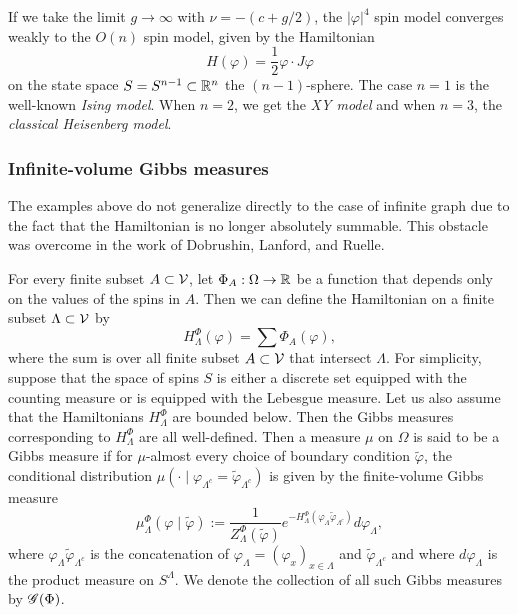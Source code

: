 If we take the limit $g\to\infty$ with $\nu = -(c + g / 2)$, the
$|\varphi|^4$ spin model converges
weakly to the $O(n)$ spin model, given by the Hamiltonian
\begin{equation}
H(\varphi) = \frac{1}{2} \varphi \cdot J \varphi
\end{equation}
on the state space $S = S^{n-1} \subset {\mathbb R}^n$ the $(n-1)$-sphere.
The case $n = 1$ is the well-known \emph{Ising model}. When $n = 2$, we get the \emph{XY model}
and when $n = 3$, the \emph{classical Heisenberg model}.


\subsubsection{Infinite-volume Gibbs measures}


The examples above do not generalize directly to the case of infinite graph due to the fact
that the Hamiltonian is no longer absolutely summable. This obstacle was overcome in the work
of Dobrushin, Lanford, and Ruelle.

For every finite subset $A \subset \mathcal{V}$, let $\Phi_A : \Omega \rightarrow {\mathbb R}$ be a function that
depends only on the values of the spins in $A$. Then we can define the Hamiltonian on a finite
subset $\Lambda \subset \mathcal{V}$ by
\begin{equation}
H^\Phi_\Lambda(\varphi) = \sum \Phi_A(\varphi),
\end{equation}
where the sum is over all finite subset $A \subset \mathcal{V}$ that intersect $\Lambda$.
For simplicity, suppose that the space of spins $S$ is either a discrete set equipped with the
counting measure or is equipped with the Lebesgue measure. Let us also assume that the Hamiltonians
$H^\Phi_\Lambda$ are bounded below. Then the  Gibbs measures corresponding to $H^\Phi_\Lambda$ are
all well-defined. Then a measure $\mu$ on $\Omega$ is said to be a Gibbs measure if for $\mu$-almost
every choice of boundary condition $\tilde\varphi$, the conditional distribution
$\mu(\cdot \mid \varphi_{\Lambda^c} = \tilde\varphi_{\Lambda^c})$ is given by the finite-volume Gibbs
measure
\begin{equation}
\mu^\Phi_\Lambda(\varphi \mid \tilde\varphi)
  :=
\frac{1}{Z^\Phi_\Lambda(\tilde\varphi)}
e^{-H^\Phi_\Lambda(\varphi_\Lambda \tilde\varphi_{\Lambda^c})}
d\varphi_\Lambda,
\end{equation}
where $\varphi_\Lambda\tilde\varphi_{\Lambda^c}$ is the concatenation of
$\varphi_\Lambda = (\varphi_x)_{x\in\Lambda}$ and $\tilde\varphi_{\Lambda^c}$
and where $d\varphi_\Lambda$ is the product measure on $S^\Lambda$.
We denote the collection of all such Gibbs measures by $\mathscr{G}(\Phi)$.

